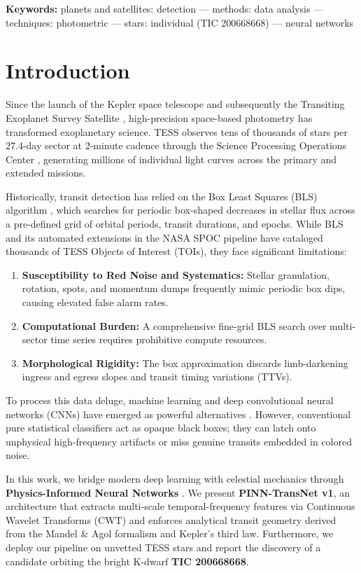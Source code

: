 \documentclass[11pt,a4paper]{article}
\begin{document}
\textbf{Keywords:} planets and satellites: detection --- methods: data analysis --- techniques: photometric --- stars: individual (TIC 200668668) --- neural networks

\section{Introduction}

Since the launch of the Kepler space telescope and subsequently the Transiting Exoplanet Survey Satellite \citep[TESS;][]{ricker2015transiting}, high-precision space-based photometry has transformed exoplanetary science. TESS observes tens of thousands of stars per 27.4-day sector at 2-minute cadence through the Science Processing Operations Center \citep[SPOC;][]{guerrero2021tess}, generating millions of individual light curves across the primary and extended missions.

Historically, transit detection has relied on the Box Least Squares (BLS) algorithm \citep{kovacs2002box}, which searches for periodic box-shaped decreases in stellar flux across a pre-defined grid of orbital periods, transit durations, and epochs. While BLS and its automated extensions in the NASA SPOC pipeline have cataloged thousands of TESS Objects of Interest (TOIs), they face significant limitations:
\begin{enumerate}
    \item \textbf{Susceptibility to Red Noise and Systematics:} Stellar granulation, rotation, spots, and momentum dumps frequently mimic periodic box dips, causing elevated false alarm rates.
    \item \textbf{Computational Burden:} A comprehensive fine-grid BLS search over multi-sector time series requires prohibitive compute resources.
    \item \textbf{Morphological Rigidity:} The box approximation discards limb-darkening ingress and egress slopes and transit timing variations (TTVs).
\end{enumerate}

To process this data deluge, machine learning and deep convolutional neural networks (CNNs) have emerged as powerful alternatives \citep{shallue2018identifying, pearson2018searching}. However, conventional pure statistical classifiers act as opaque black boxes; they can latch onto unphysical high-frequency artifacts or miss genuine transits embedded in colored noise. 

In this work, we bridge modern deep learning with celestial mechanics through \textbf{Physics-Informed Neural Networks} \citep[PINNs;][]{raissi2019physics}. We present \textbf{PINN-TransNet v1}, an architecture that extracts multi-scale temporal-frequency features via Continuous Wavelet Transforms (CWT) and enforces analytical transit geometry derived from the Mandel \& Agol \citep{mandel2002analytic} formalism and Kepler's third law. Furthermore, we deploy our pipeline on unvetted TESS stars and report the discovery of a candidate orbiting the bright K-dwarf \textbf{TIC 200668668}.
\end{document}
